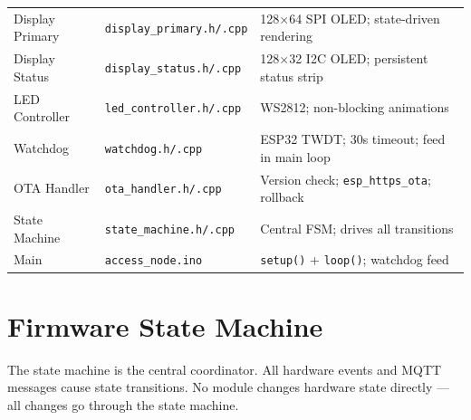 \begin{table}[H]
\begin{tabular}{L{4.5cm}L{4.5cm}L{5.5cm}}
Display Primary & \texttt{display\_primary.h/.cpp} & 128$\times$64 SPI OLED; state-driven rendering \\
Display Status & \texttt{display\_status.h/.cpp} & 128$\times$32 I2C OLED; persistent status strip \\
LED Controller & \texttt{led\_controller.h/.cpp} & WS2812; non-blocking animations \\
Watchdog & \texttt{watchdog.h/.cpp} & ESP32 TWDT; 30s timeout; feed in main loop \\
OTA Handler & \texttt{ota\_handler.h/.cpp} & Version check; \texttt{esp\_https\_ota}; rollback \\
State Machine & \texttt{state\_machine.h/.cpp} & Central FSM; drives all transitions \\
Main & \texttt{access\_node.ino} & \texttt{setup()} + \texttt{loop()}; watchdog feed \\
\bottomrule
\end{tabular}
\end{table}

\section{Firmware State Machine}

The state machine is the central coordinator. All hardware events and MQTT messages cause state transitions. No module changes hardware state directly --- all changes go through the state machine.

